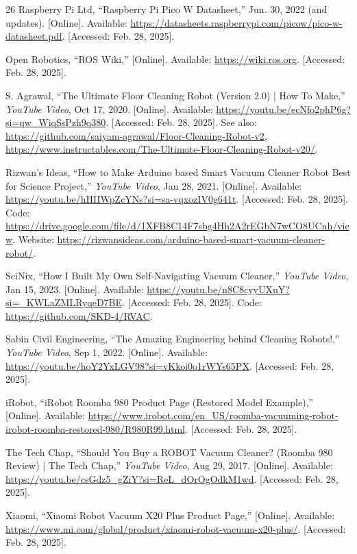 \begin{thebibliography}{26}
Raspberry Pi Ltd, ``Raspberry Pi Pico W Datasheet,'' Jun. 30, 2022 (and updates). [Online]. Available: \url{https://datasheets.raspberrypi.com/picow/pico-w-datasheet.pdf}. [Accessed: Feb. 28, 2025].

Open Robotics, ``ROS Wiki,'' [Online]. Available: \url{https://wiki.ros.org}. [Accessed: Feb. 28, 2025].

S. Agrawal, ``The Ultimate Floor Cleaning Robot (Version 2.0) | How To Make,'' \textit{YouTube Video}, Oct 17, 2020. [Online]. Available: \url{https://youtu.be/ecNfo2phP6g?si=qw_WiqSsPzh9q380}. [Accessed: Feb. 28, 2025]. See also: \url{https://github.com/saiyam-agrawal/Floor-Cleaning-Robot-v2}, \url{https://www.instructables.com/The-Ultimate-Floor-Cleaning-Robot-v20/}.

Rizwan's Ideas, ``How to Make Arduino based Smart Vacuum Cleaner Robot Best for Science Project,'' \textit{YouTube Video}, Jan 28, 2021. [Online]. Available: \url{https://youtu.be/hHIIWpZcYNs?si=sa-vqxozIV0g641t}. [Accessed: Feb. 28, 2025]. Code: \url{https://drive.google.com/file/d/1XFB8C14F7sbg4Hh2A2rEGbN7wCO8UCnh/view}. Website: \url{https://rizwansideas.com/arduino-based-smart-vacuum-cleaner-robot/}.

SciNix, ``How I Built My Own Self-Navigating Vacuum Cleaner,'' \textit{YouTube Video}, Jan 15, 2023. [Online]. Available: \url{https://youtu.be/n8C8cyyUXuY?si=_KWLaZMLRyqeD7BE}. [Accessed: Feb. 28, 2025]. Code: \url{https://github.com/SKD-4/RVAC}.

Sabin Civil Engineering, ``The Amazing Engineering behind Cleaning Robots!,'' \textit{YouTube Video}, Sep 1, 2022. [Online]. Available: \url{https://youtu.be/hoY2YxLGV98?si=vKkoi0o1rWYs65PX}. [Accessed: Feb. 28, 2025].

iRobot, ``iRobot Roomba 980 Product Page (Restored Model Example),'' [Online]. Available: \url{https://www.irobot.com/en_US/roomba-vacuuming-robot-irobot-roomba-restored-980/R980R99.html}. [Accessed: Feb. 28, 2025].

The Tech Chap, ``Should You Buy a ROBOT Vacuum Cleaner? (Roomba 980 Review) | The Tech Chap,'' \textit{YouTube Video}, Aug 29, 2017. [Online]. Available: \url{https://youtu.be/csGdz5_gZiY?si=ReL_dOrOgOdkM1wd}. [Accessed: Feb. 28, 2025].

Xiaomi, ``Xiaomi Robot Vacuum X20 Plus Product Page,'' [Online]. Available: \url{https://www.mi.com/global/product/xiaomi-robot-vacuum-x20-plus/}. [Accessed: Feb. 28, 2025].


\end{thebibliography}
